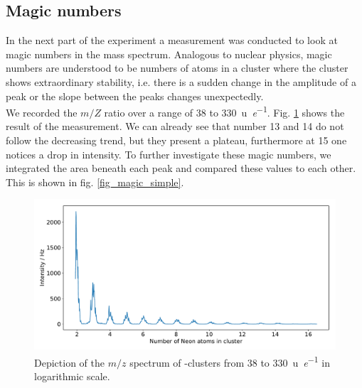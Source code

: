 \documentclass[a4paper,10pt]{article}
\begin{document}
\subsection{Magic numbers}
In the next part of the experiment a measurement was conducted to look at magic numbers in the mass spectrum. Analogous to nuclear physics, magic numbers are understood to be numbers of atoms in a cluster where the cluster shows extraordinary stability, i.e. there is a sudden change in the amplitude of a peak or the slope between the peaks changes unexpectedly. \\
We recorded the $m/Z$ ratio over a range of \SI{38}{} to \SI{330}{\atomicmassunit \per \elementarycharge}. Fig. \ref{fig_magic_peak} shows the result of the measurement. We can already see that number 13 and 14 do not follow the decreasing trend, but they present a plateau, furthermore at 15 one notices a drop in intensity. To further investigate these magic numbers, we integrated the area beneath each peak and compared these values to each other. This is shown in fig. \ref{fig_magic_simple}.

\begin{figure}[H]
	\centering
	\includegraphics[width = 0.8 \textwidth]{magic_peaks}
	\caption{Depiction of the $m/z$ spectrum of -clusters from \SI{38}{} to \SI{330}{\atomicmassunit \per \elementarycharge} in logarithmic scale.}
	\label{fig_magic_peak}
\end{figure}
\end{document}
